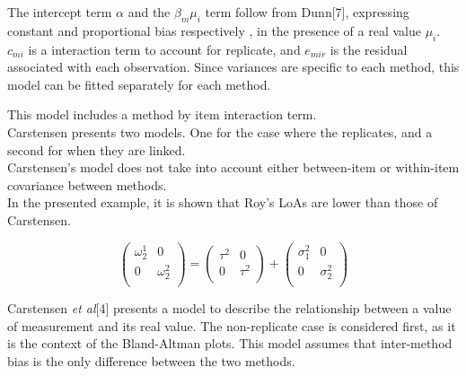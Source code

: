 \documentclass[12pt, a4paper]{report}
\theoremstyle{plain}
\theoremstyle{definition}
\theoremstyle{remark}
\begin{document}
%
The intercept term $\alpha$ and the $\beta_{m}\mu_{i}$ term follow
from Dunn[7], expressing constant and proportional bias
respectively , in the presence of a real value $\mu_{i}.$
$c_{mi}$ is a interaction term to account for replicate, and
$e_{mir}$ is the residual associated with each observation.
Since variances are specific to each method, this model can be
fitted separately for each method.

%


This model includes a method by item interaction term.\\

Carstensen presents two models. One for the case where the replicates, and a second for when they are linked.\\
Carstensen's model does not take into account either between-item or within-item covariance between methods.\\
In the presented example, it is shown that Roy's LoAs are lower than those of Carstensen.




\[\left(\begin{array}{cc}
\omega^1_2  & 0 \\
0 & \omega^2_2 \\
\end{array}  \right)
=  \left(
\begin{array}{cc}
\tau^2  & 0 \\
0 & \tau^2 \\
\end{array} \right)+
\left(
\begin{array}{cc}
\sigma^2_1  & 0 \\
0 & \sigma^2_2 \\
\end{array}\right)
\]






%

Carstensen \textit{et al}[4] presents a model to describe the relationship between a value of measurement and its real value.
The non-replicate case is considered first, as it is the context of the Bland-Altman plots.
This model assumes that inter-method bias is the only difference between the two methods.
\end{document}
